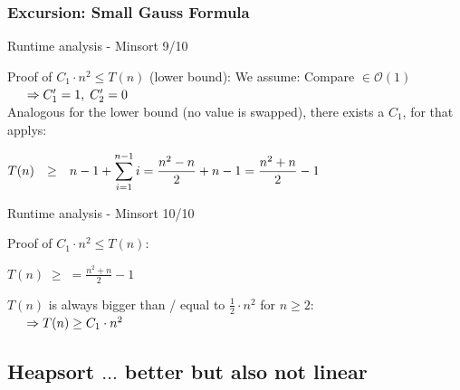\documentclass{beamer}
\begin{document}
 \begin{frame}
   \frametitle{Excursion: Small Gauss Formula}
 \end{frame}

\begin{frame}{Runtime analysis - Minsort 9/10}
  \begin{block}{Proof of $C_1 \cdot n^2 \leq T(n)$
      ({\color{Mittel-Gruen}lower bound}):}
    We assume: Compare $\in \mathcal{O}(1)$\\
    $\hspace{1.5em}\Rightarrow C'_1 = 1, \; C'_2 = 0$\\
    \vspace*{0.5em}
    Analogous for the {\color{Mittel-Gruen}lower bound}
    (no value is swapped), there exists a $C_1$, for that
    applys:\\[0.5em]
    \begin{centering}
      \begin{math}
        \begin{array}{@{}rcl@{}}
          T(n) & \geq &
          \displaystyle
          n - 1 + \sum^{n - 1}_{i=1} i
          = \frac{n^2 - n}{2} + n - 1
          = \frac{n^2 + n}{2} - 1
        \end{array}
      \end{math}
    \end{centering}
  \end{block}
\end{frame}


\begin{frame}{Runtime analysis - Minsort 10/10}
  \begin{block}{Proof of $C_1 \cdot n^2 \leq T(n)$:}
    \vspace*{0.5em}
    \begin{center}
      $\displaystyle
        T(n) \; \geq \;
          = \frac{n^2 + n}{2} - 1
      $\\
    \end{center}
    $T(n)$ is always bigger than / equal to $\frac{1}{2} \cdot n^2$
    for $n \geq 2$:\\[1.0em]
    $\hspace*{1.5em}\Rightarrow T(n) \geq C_1 \cdot n^2$
  \end{block}
\end{frame}\subsection{Heapsort $\ldots$ better but also not linear }
\end{document}
